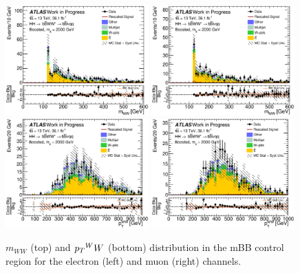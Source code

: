 \newpage
\begin{figure}[H]
\begin{center}
\includegraphics[width=0.49\textwidth]{figures/kinplots/C_2tag_mbbcr_elec_presel_met50_WWMass}
\includegraphics[width=0.49\textwidth]{figures/kinplots/C_2tag_mbbcr_muon_presel_met50_WWMass}\\
\includegraphics[width=0.49\textwidth]{figures/kinplots/C_2tag_mbbcr_elec_presel_met50_WWPt}
\includegraphics[width=0.49\textwidth]{figures/kinplots/C_2tag_mbbcr_muon_presel_met50_WWPt}\\
\caption[Kinematic distributions in the mBB control region for the electron and muon channels]{$m_{WW}$ (top) and $\pt^WW$ (bottom) distribution in the mBB control region for the electron (left) and muon (right) channels.}
\label{fig:mbbcr_plots}
\end{center}
\end{figure}

